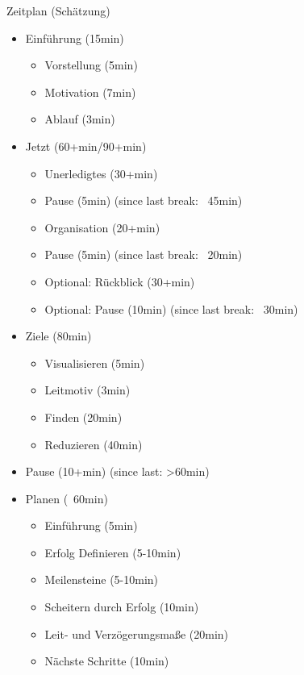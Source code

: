 \begin{frame}{Zeitplan (Schätzung)}
    \begin{itemize}
        \item Einführung (15min)
            \begin{itemize}
                \item Vorstellung (5min)
                \item Motivation (7min)
                \item Ablauf (3min)
            \end{itemize}
        \item Jetzt (60+min/90+min)
            \begin{itemize}
                \item Unerledigtes (30+min)
                \item Pause (5min) (since last break: ~45min)
                \item Organisation (20+min)
                \item Pause (5min) (since last break: ~20min)
                \item Optional: Rückblick (30+min)
                \item Optional: Pause (10min) (since last break: ~30min)
            \end{itemize}
        \item Ziele (80min)
            \begin{itemize}
                \item Visualisieren (5min)
                \item Leitmotiv (3min)
                \item Finden (20min)
                \item Reduzieren (40min)
            \end{itemize}
        \item Pause (10+min) (since last: >60min)
        \item Planen (~60min)
            \begin{itemize}
                \item Einführung (5min)
                \item Erfolg Definieren (5-10min)
                \item Meilensteine (5-10min)
                \item Scheitern durch Erfolg (10min)
                \item Leit- und Verzögerungsmaße (20min)
                \item Nächste Schritte (10min)

\end{itemize}
\end{itemize}
\end{frame}
